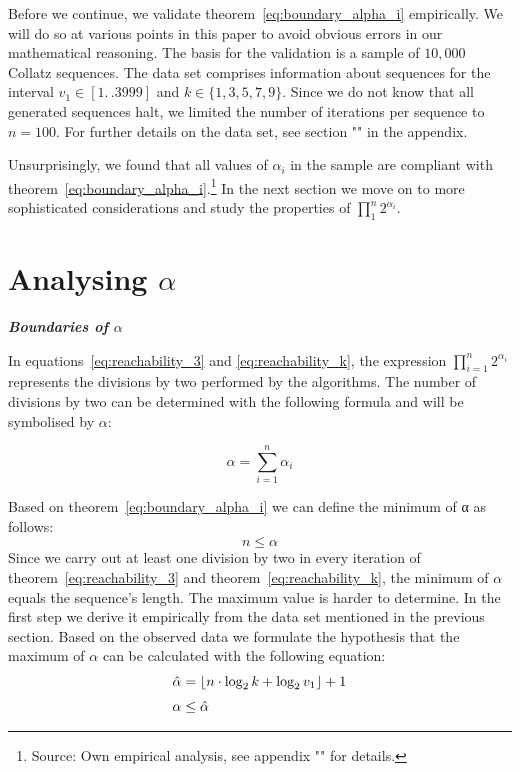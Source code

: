 \documentclass{SciPress_2015}
\renewcommand{\subsection}[1]{\textit{\textbf{#1}}}
\begin{document}
Before we continue, we validate theorem~\ref{eq:boundary_alpha_i} empirically. We will do so at various points in this paper to avoid obvious errors in our mathematical reasoning. The basis for the validation is a sample of $10,000$ Collatz sequences. The data set comprises information about sequences for the interval $v_1\in[1\mathrel{{.}\,{.}}3999]$ and $k\in\{1,3,5,7,9\}$. Since we do not know that all generated sequences halt, we limited the number of iterations per sequence to $n=100$. For further details on the data set, see section "" in the appendix.

Unsurprisingly, we found that all values of $\alpha_i$ in the sample are compliant with theorem~\ref{eq:boundary_alpha_i}.\footnote{Source: Own empirical analysis, see appendix "" for details.} In the next section we move on to more sophisticated considerations and study the properties of $\prod_{1}^{n}2^{\alpha_i}$.

\section{Analysing \boldmath$\alpha$}
\label{sec:analysing_alpha}
\subsection{Boundaries of \boldmath$\alpha$}
\par\noindent
In equations~\ref{eq:reachability_3} and \ref{eq:reachability_k}, the expression $\prod_{i=1}^{n}2^{\alpha_i}$  represents the divisions by two performed by the algorithms. The number of divisions by two can be determined with the following formula and will be symbolised by $\alpha$:

\[
\alpha=\sum_{i=1}^{n}{\alpha_i}
\]

\newpage
\par\noindent
Based on theorem~\ref{eq:boundary_alpha_i} we can define the minimum of α as follows:
\[
n\le \alpha
\]
Since we carry out at least one division by two in every iteration of theorem~\ref{eq:reachability_3} and theorem~\ref{eq:reachability_k}, the minimum of $\alpha$ equals the sequence's length. The maximum value is harder to determine. In the first step we derive it empirically from the data set mentioned in the previous section. Based on the observed data we formulate the hypothesis that the maximum of $\alpha$ can be calculated with the following equation:
\begin{equation}
\label{eq:max_alpha}
\begin{array}{l}
\hat\alpha=\lfloor n\cdot\log_2k+\log_2v_1\rfloor+1\\[\medskipamount]
\alpha\le\hat\alpha
\end{array}	
\end{equation}
\end{document}

